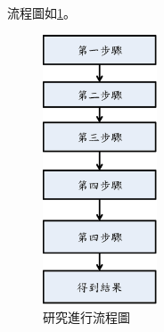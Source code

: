 流程圖如\ref{fig:ResearchFlowChart}。
\begin{figure}[htbp]
	\centering
	\includegraphics[height=8cm]{graphs/introduction/ResearchFlowChart.eps}
	\caption{研究進行流程圖}
	\label{fig:ResearchFlowChart}
\end{figure}
